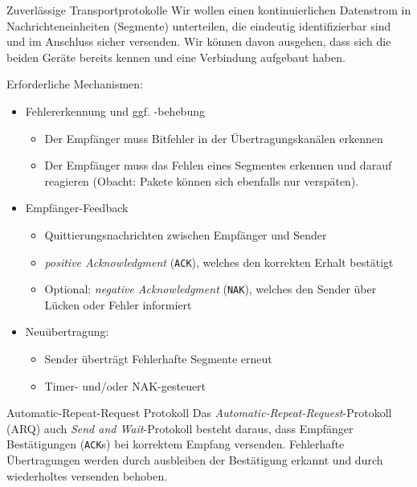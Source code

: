 \begin{defi}{Zuverlässige Transportprotokolle}
    Wir wollen einen kontinuierlichen Datenstrom in Nachrichteneinheiten (Segmente) unterteilen, die eindeutig identifizierbar sind und im Anschluss sicher versenden.
    Wir können davon ausgehen, dass sich die beiden Geräte bereits kennen und eine Verbindung aufgebaut haben.

    Erforderliche Mechanismen:
    \begin{itemize}
        \item Fehlererkennung und ggf. -behebung
              \begin{itemize}
                  \item Der Empfänger muss Bitfehler in der Übertragungskanälen erkennen
                  \item Der Empfänger muss das Fehlen eines Segmentes erkennen und darauf reagieren (Obacht: Pakete können sich ebenfalls nur verspäten).
              \end{itemize}
        \item Empfänger-Feedback
              \begin{itemize}
                  \item Quittierungsnachrichten zwischen Empfänger und Sender
                  \item \emph{positive Acknowledgment} (\texttt{ACK}), welches den korrekten Erhalt bestätigt
                  \item Optional: \emph{negative Acknowledgment} (\texttt{NAK}), welches den Sender über Lücken oder Fehler informiert
              \end{itemize}
        \item Neuübertragung:
              \begin{itemize}
                  \item Sender überträgt Fehlerhafte Segmente erneut
                  \item Timer- und/oder NAK-gesteuert
              \end{itemize}
    \end{itemize}
\end{defi}

\begin{defi}{Automatic-Repeat-Request Protokoll}
    Das \emph{Automatic-Repeat-Request}-Protokoll (ARQ) auch \emph{Send and Wait}-Protokoll besteht daraus, dass Empfänger Bestätigungen (\texttt{ACK}s) bei korrektem Empfang versenden.
    Fehlerhafte Übertragungen werden durch ausbleiben der Bestätigung erkannt und durch wiederholtes versenden behoben.
\end{defi}

